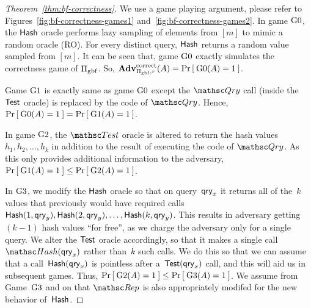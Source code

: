 \begin{proof}[Theorem~\ref{thm:bf-correctness}]
We use a game playing argument, please refer to Figures~\ref{fig:bf-correctness-games1} and~\ref{fig:bf-correctness-games2}. In game $\text{G0}$, the $\mathsf{Hash}$ oracle performs lazy sampling of elements from $[m]$ to mimic a random oracle (RO). For every distinct query, $\mathsf{Hash}$ returns a random value sampled from $[m]$. It can be seen that, game $\text{G0}$ exactly simulates the correctness game of $\Pi_{\mathrm{gbf}}$.  So, $\mathrm{\mathbf{Adv}}^{\mathrm{correct}}_{\Pi_{\mathrm{gbf}},r}(A) = \Pr\left[\: \text{G0}(A) = 1 \:\right]$.

Game $\text{G1}$ is exactly same as game $\text{G0}$ except the $\Qry$ call (inside the $\mathsf{Test}$ oracle) is replaced by the code of $\Qry$.  Hence, $\Pr\left[\: \text{G0}(A) = 1 \:\right] = \Pr\left[\: \text{G1}(A) = 1 \:\right]$.

In game $\text{G2}$, the $\Test$ oracle is altered to return the hash values~$h_1,h_2,\ldots, h_k$ in addition to the result of executing the code of $\Qry$.  As this only provides additional information to the adversary, $\Pr\left[\: \text{G1}(A) = 1 \:\right] \leq \Pr\left[\: \text{G2}(A) = 1 \:\right]$.

In $\text{G3}$, we modify the $\mathsf{Hash}$ oracle so that on query~$\mathsf{qry}_x$ it returns all of the~$k$ values that previously would have required calls $\HashOracle(1,\qry_y),\HashOracle(2,\qry_y),\ldots,\linebreak\HashOracle(k,\qry_y)$.  This results in adversary getting $(k-1)$ hash values ``for free'', as we charge the adversary only for a single query.  We alter the $\mathsf{Test}$ oracle accordingly, so that it makes a single call $\Hash(\qry_x)$ rather than~$k$ such calls.  We do this so that we can assume that a call~$\mathsf{Hash}(\mathsf{qry}_x)$ is pointless after a~$\mathsf{Test}(\mathsf{qry}_x)$ call, and this will aid us in subsequent games.  Thus, $\Pr\left[\: \text{G2}(A) = 1 \:\right] \leq \Pr\left[\: \text{G3}(A) = 1 \:\right]$.  We assume from Game~$\text{G3}$ and on that $\Rep$ is also appropriately modifed for the new behavior of~$\mathsf{Hash}$.


\end{proof}

